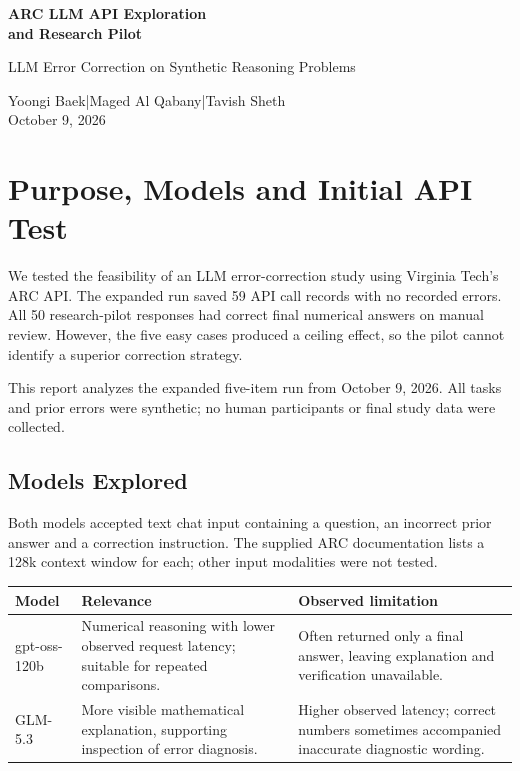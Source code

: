 \documentclass[11pt,letterpaper]{article}
\begin{document}
\begin{center}
{\LARGE\bfseries ARC LLM API Exploration\\[3pt]and Research Pilot\par}
\vspace{5pt}
{\large LLM Error Correction on Synthetic Reasoning Problems\par}
\vspace{5pt}
Yoongi Baek\enspace |\enspace Maged Al Qabany\enspace |\enspace Tavish Sheth\\[2pt]
October 9, 2026
\end{center}
\vspace{3pt}
\section{Purpose, Models and Initial API Test}
We tested the feasibility of an LLM error-correction study using Virginia Tech's ARC API. The expanded run saved 59 API call records with no recorded errors. All 50 research-pilot responses had correct final numerical answers on manual review. However, the five easy cases produced a ceiling effect, so the pilot cannot identify a superior correction strategy.

This report analyzes the expanded five-item run from October 9, 2026. All tasks and prior errors were synthetic; no human participants or final study data were collected.

\subsection*{Models Explored}
Both models accepted text chat input containing a question, an incorrect prior answer and a correction instruction. The supplied ARC documentation lists a 128k context window for each; other input modalities were not tested.

{\small
\renewcommand{\arraystretch}{1.20}
\begin{tabularx}{\linewidth}{Y{0.60}Y{1.20}Y{1.20}}
\toprule
{}
\textbf{Model} & \textbf{Relevance} & \textbf{Observed limitation} \\
\midrule
gpt-oss-120b & Numerical reasoning with lower observed request latency; suitable for repeated comparisons. & Often returned only a final answer, leaving explanation and verification unavailable. \\
GLM-5.3 & More visible mathematical explanation, supporting inspection of error diagnosis. & Higher observed latency; correct numbers sometimes accompanied inaccurate diagnostic wording. \\
\bottomrule
\end{tabularx}}
\end{document}
